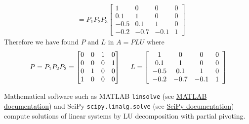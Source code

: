 \begin{example}
\begin{align*}
&=
P_1 P_2 P_3
\left[ \begin{array}{cccc} 1 & 0 & 0 & 0 \\ 0.1 & 1 & 0 & 0 \\ -0.5 & 0.1 & 1 & 0 \\ -0.2 & -0.7 & -0.1 & 1 \end{array} \right]
\end{align*}
Therefore we have found $P$ and $L$ in $A = PLU$ where
$$
P = P_1 P_2 P_3 = \begin{bmatrix} 0 & 0 & 1 & 0 \\ 0 & 0 & 0 & 1 \\ 0 & 1 & 0 & 0 \\ 1 & 0 & 0 & 0 \end{bmatrix}
\hspace{5mm}
L = \left[ \begin{array}{cccc} 1 & 0 & 0 & 0 \\ 0.1 & 1 & 0 & 0 \\ -0.5 & 0.1 & 1 & 0 \\ -0.2 & -0.7 & -0.1 & 1 \end{array} \right]
$$
\end{example}

\begin{note}
Mathematical software such as MATLAB {\tt linsolve} (see \href{https://www.mathworks.com/help/matlab/ref/linsolve.html}{MATLAB documentation}) and SciPy {\tt scipy.linalg.solve} (see \href{https://docs.scipy.org/doc/scipy-0.14.0/reference/generated/scipy.linalg.solve.html}{SciPy documentation}) compute solutions of linear systems by LU decomposition with partial pivoting.
\end{note}